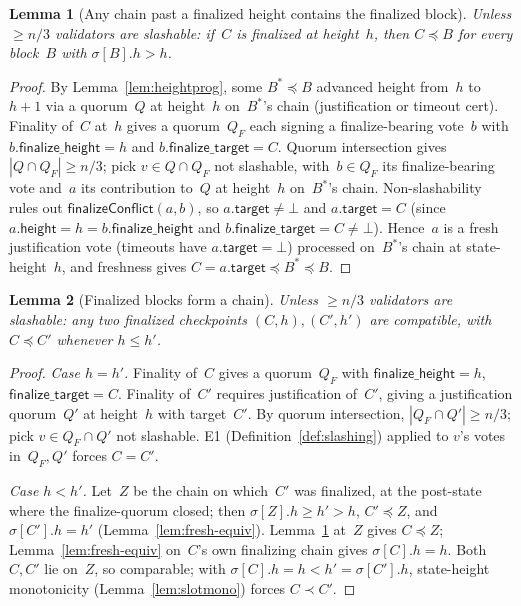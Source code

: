 \ifx\litemode\undefined\documentclass{article}\fi
\newcommand{\target}{\mathsf{target}}
\newcommand{\height}{\mathsf{height}}
\newcommand{\finalizeHeight}{\mathsf{finalize\_height}}
\newcommand{\finalizeTarget}{\mathsf{finalize\_target}}
\newcommand{\finalizeConflict}{\textsf{finalizeConflict}\xspace}
\theoremstyle{plain}
\newtheorem{lemma}{Lemma}
\theoremstyle{definition}
\theoremstyle{remark}
\begin{document}
\begin{lemma}[Any chain past a finalized height contains the finalized block]\label{lem:mainsafety}
Unless $\geq n/3$ validators are slashable: if~$C$ is finalized at height~$h$, then $C \preceq B$ for every block~$B$ with $\sigma[B].h > h$.
\end{lemma}

\begin{proof}
By Lemma~\ref{lem:heightprog}, some $B^* \preceq B$ advanced height from~$h$ to~$h+1$ via a quorum~$Q$ at height~$h$ on~$B^*$'s chain (justification or timeout cert).
Finality of~$C$ at~$h$ gives a quorum~$Q_F$ each signing a finalize-bearing vote~$b$ with $b.\finalizeHeight = h$ and $b.\finalizeTarget = C$.
Quorum intersection gives $|Q \cap Q_F| \geq n/3$; pick $v \in Q \cap Q_F$ not slashable, with~$b \in Q_F$ its finalize-bearing vote and~$a$ its contribution to~$Q$ at height~$h$ on~$B^*$'s chain.
Non-slashability rules out $\finalizeConflict(a, b)$, so $a.\target \neq \bot$ and $a.\target = C$ (since $a.\height = h = b.\finalizeHeight$ and $b.\finalizeTarget = C \neq \bot$).
Hence~$a$ is a fresh justification vote (timeouts have $a.\target = \bot$) processed on~$B^*$'s chain at state-height~$h$, and freshness gives $C = a.\target \preceq B^* \preceq B$.
\end{proof}

\begin{lemma}[Finalized blocks form a chain]\label{lem:finchain}
Unless $\geq n/3$ validators are slashable: any two finalized checkpoints $(C, h), (C', h')$ are compatible, with $C \preceq C'$ whenever $h \leq h'$.
\end{lemma}

\begin{proof}
\emph{Case $h = h'$.}
Finality of~$C$ gives a quorum~$Q_F$ with $\finalizeHeight = h$, $\finalizeTarget = C$.
Finality of~$C'$ requires justification of~$C'$, giving a justification quorum~$Q'$ at height~$h$ with target~$C'$.
By quorum intersection, $|Q_F \cap Q'| \geq n/3$; pick $v \in Q_F \cap Q'$ not slashable.
E1 (Definition~\ref{def:slashing}) applied to $v$'s votes in~$Q_F, Q'$ forces $C = C'$.

\emph{Case $h < h'$.}
Let~$Z$ be the chain on which~$C'$ was finalized, at the post-state where the finalize-quorum closed; then $\sigma[Z].h \geq h' > h$, $C' \preceq Z$, and $\sigma[C'].h = h'$ (Lemma~\ref{lem:fresh-equiv}).
Lemma~\ref{lem:mainsafety} at~$Z$ gives $C \preceq Z$; Lemma~\ref{lem:fresh-equiv} on~$C$'s own finalizing chain gives $\sigma[C].h = h$.
Both~$C, C'$ lie on~$Z$, so comparable; with $\sigma[C].h = h < h' = \sigma[C'].h$, state-height monotonicity (Lemma~\ref{lem:slotmono}) forces $C \prec C'$.
\end{proof}
\end{document}
